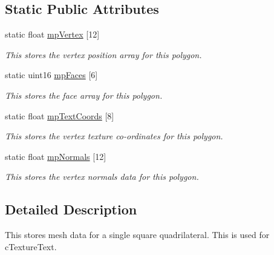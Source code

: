 \subsection*{Static Public Attributes}
\begin{DoxyCompactItemize}
\item 
\hypertarget{classv2_d_polygon_a47b7a79cf24904b50276e748db16b224}{
static float \hyperlink{classv2_d_polygon_a47b7a79cf24904b50276e748db16b224}{mpVertex} \mbox{[}12\mbox{]}}
\label{classv2_d_polygon_a47b7a79cf24904b50276e748db16b224}

\begin{DoxyCompactList}\small\item\em This stores the vertex position array for this polygon. \end{DoxyCompactList}\item 
\hypertarget{classv2_d_polygon_aba09ca689e6930772e157d906fd46e7d}{
static uint16 \hyperlink{classv2_d_polygon_aba09ca689e6930772e157d906fd46e7d}{mpFaces} \mbox{[}6\mbox{]}}
\label{classv2_d_polygon_aba09ca689e6930772e157d906fd46e7d}

\begin{DoxyCompactList}\small\item\em This stores the face array for this polygon. \end{DoxyCompactList}\item 
\hypertarget{classv2_d_polygon_aba84b38410267fdaa1c63349e3f7636f}{
static float \hyperlink{classv2_d_polygon_aba84b38410267fdaa1c63349e3f7636f}{mpTextCoords} \mbox{[}8\mbox{]}}
\label{classv2_d_polygon_aba84b38410267fdaa1c63349e3f7636f}

\begin{DoxyCompactList}\small\item\em This stores the vertex texture co-\/ordinates for this polygon. \end{DoxyCompactList}\item 
\hypertarget{classv2_d_polygon_aedef6004e60c99d0d167fa8218bde7f0}{
static float \hyperlink{classv2_d_polygon_aedef6004e60c99d0d167fa8218bde7f0}{mpNormals} \mbox{[}12\mbox{]}}
\label{classv2_d_polygon_aedef6004e60c99d0d167fa8218bde7f0}

\begin{DoxyCompactList}\small\item\em This stores the vertex normals data for this polygon. \end{DoxyCompactList}\end{DoxyCompactItemize}


\subsection{Detailed Description}
This stores mesh data for a single square quadrilateral. This is used for cTextureText. 